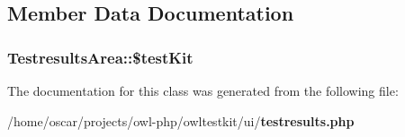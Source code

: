 \subsection{Member Data Documentation}
\subsubsection[{\$testKit}]{\setlength{\rightskip}{0pt plus 5cm}TestresultsArea::\$testKit\hspace{0.3cm}{\ttfamily  [private]}}\label{classTestresultsArea_a44b10285c3f21c9bfc5cbf8b7deca72c}


The documentation for this class was generated from the following file:\begin{DoxyCompactItemize}
\item 
/home/oscar/projects/owl-\/php/owltestkit/ui/{\bf testresults.php}\end{DoxyCompactItemize}
